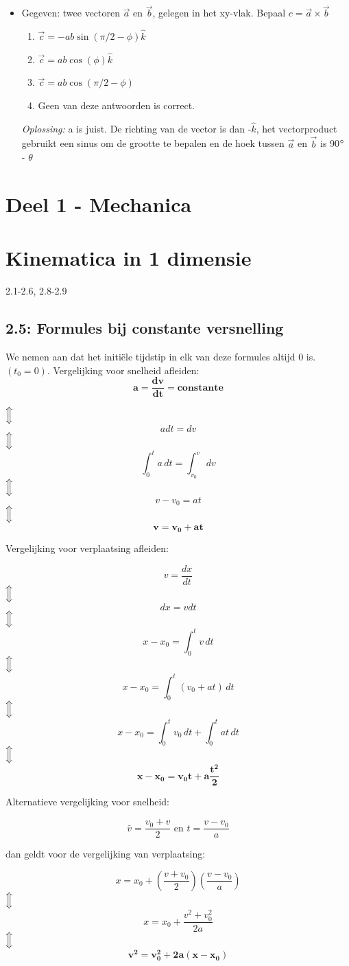 \documentclass[12pt,a4paper]{article}
\newcommand{\Luda}{\Big\Updownarrow}
\begin{document}
\begin{itemize}
        \item Gegeven: twee vectoren $\vec{a}$ en $\vec{b}$, gelegen in het xy-vlak.
        Bepaal \(c = \vec{a} \times \vec{b}\)
        \begin{enumerate}
            [label=\alph*)]
            \item \(\vec{c} = - ab \sin(\pi/2 - \phi)\hat{k}\)
            \item \(\vec{c} = ab \cos(\phi)\hat{k}\)
            \item \(\vec{c} = ab \cos(\pi/2 - \phi)\)
            \item Geen van deze antwoorden is correct.
        \end{enumerate}
        \textit{Oplossing:} a is juist. De richting van de vector is dan -$\hat{k}$, het vectorproduct gebruikt een sinus om de grootte te bepalen en de hoek tussen $\vec{a}$ en $\vec{b}$ is 90$\degree$ - $\theta$
    \end{itemize}


    \section{Deel 1 - Mechanica}


    \section{Kinematica in 1 dimensie}
    2.1-2.6, 2.8-2.9

    \subsection{2.5: Formules bij constante versnelling}
    We nemen aan dat het initiële tijdstip in elk van deze formules altijd 0 is. \((t_{0} = 0)\).
    Vergelijking voor snelheid afleiden:
    \[\mathbf{a = \frac{dv}{dt} = constante}\]
    \begin{center}
	    $\Luda$ \[a dt = dv\]
	    $\Luda$ \[\int_{0}^{t} a \, dt = \int_{v_0}^{v} \,dv\]
	    $\Luda$\[v - v_0 = at\]
	    $\Luda$\[\mathbf{v = v_0 + at}\]
    \end{center}
\newpage
    Vergelijking voor verplaatsing afleiden:
    \begin{center}
               \[v = \frac{dx}{dt}\]
	    $\Luda$\[dx = v dt\]
	    $\Luda$\[x - x_0 = \int_{0}^{t} v \, dt\]
	    $\Luda$\[x - x_0 = \int_{0}^{t} (v_0 + at) \, dt\]
	    $\Luda$\[x - x_0 = \int_{0}^{t} v_0 \, dt + \int_{0}^{t} at \, dt\]
	    $\Luda$\[\mathbf{x - x_0 = v_0t + a\frac{t^2}{2}}\]
    \end{center}
    Alternatieve vergelijking voor snelheid:
    \begin{center}
    	\[\bar{v} = \frac{v_0 + v}{2} \text{ en } t = \frac{v - v_0}{a}\]
    \end{center}
    dan geldt voor de vergelijking van verplaatsing:
    \begin{center}
               \[x = x_0 + (\frac{v + v_0}{2})(\frac{v - v_0}{a})\]
	    $\Luda$\[x = x_0 + \frac{v^2 + v_0^2}{2a}\]
	    $\Luda$\[\mathbf{v^2 = v_0^2 + 2a(x - x_0)}\]
    \end{center}
\end{document}
